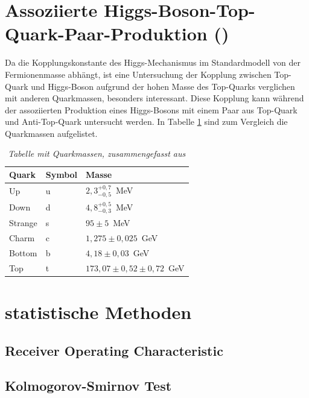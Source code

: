 \section{Assoziierte Higgs-Boson-Top-Quark-Paar-Produktion (\ttH)}
\label{ch:Theorie:sec:ttH}

Da die Kopplungskonstante des Higgs-Mechanismus im Standardmodell von der Fermionenmasse abh\"angt, ist eine Untersuchung der Kopplung zwischen Top-Quark und Higgs-Boson aufgrund der hohen Masse des Top-Quarks verglichen mit anderen Quarkmassen, besonders interessant. Diese Kopplung kann w\"ahrend der assoziierten Produktion eines Higgs-Bosons mit einem Paar aus Top-Quark und Anti-Top-Quark untersucht werden. In Tabelle \ref{tab:quarkmasse} sind zum Vergleich die Quarkmassen aufgelistet.

\begin{table}[hhh]\parbox{12cm}{
  \caption[Quarkmassen]{\it Tabelle mit Quarkmassen, zusammengefasst aus{\rm \cite{Agashe:2014kda}}
  }\label{tab:quarkmasse}}
  \begin{center}
  \begin{tabular}{lll}
  \hline
  {\bf Quark} & {\bf Symbol} & {\bf Masse}  \\
  \hline \hline
     Up		& u & $2,3^{+0,7}_{-0,5}$~MeV \\
     Down	& d & $4,8^{+0,5}_{-0,3}$~MeV \\
     Strange& s & $95\pm 5$~MeV \\
     Charm	& c & $1,275\pm 0,025$~GeV \\ 
  	 Bottom & b & $4,18\pm 0,03$~GeV \\
     Top    & t & $ 173,07\pm 0,52\pm 0,72$~GeV \\                                   
  \hline
  \end{tabular}
  \end{center}
\end{table}

\section{statistische Methoden}
\label{ch:Theorie:sec:statistischeMethoden}


\subsection{Receiver Operating Characteristic}
\label{ch:Algorithmen:subsec:ROC}


\subsection{Kolmogorov-Smirnov Test}
\label{ch:Algorithmen:subsec:KSTest}
